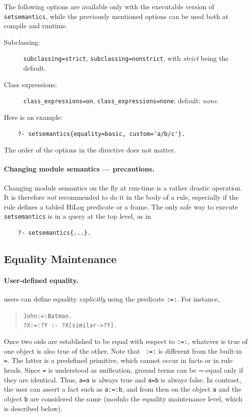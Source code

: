 \documentclass[11pt]{article}
\newcommand{\ERGO}{\mbox{\smaller{\ensuremath{\cal{E}}\smaller{{\sc{RGO}}}}}\xspace}
\newcommand{\FLSYSTEM}{\ERGO}
\begin{document}
The following options are available only with the executable version of
\texttt{setsemantics}, while the previously mentioned options can be used both
at compile and runtime.
  \begin{description}
  \item[Subclassing:] \texttt{subclassing=strict},
    \texttt{subclassing=nonstrict}, with \emph{strict} being the default.    
  \item[Class expressions:] \texttt{class\_expressions=on},
    \texttt{class\_expressions=none}; default: \emph{none}.
  \end{description}
Here is an example:
\begin{verbatim}
    ?- setsemantics{equality=basic, custom='a/b/c'}.  
\end{verbatim}
The order of the options in the directive does not matter.

\paragraph{Changing module semantics --- precautions.}
Changing module semantics on the fly at run-time is a rather drastic operation.
It is therefore \emph{not} recommended to do it in the body of a rule,
especially if the rule defines a tabled HiLog predicate or a frame.
The only safe way to execute {\tt setsemantics} is in a query at the top
level, as in
  \begin{verbatim}
    ?- setsemantics{...}.
  \end{verbatim}


\subsection{Equality Maintenance}\label{sec-eqmaintain}


\paragraph{User-defined equality.}
\FLSYSTEM users can define equality \emph{explicitly}
using the predicate {\tt :=:}. For instance,
\begin{quote}
{\tt John:=:Batman.} \\
{\tt ?X:=:?Y :- ?X[similar->?Y].} \\
\end{quote}
Once two oids are established to be equal with respect to {\tt :=:},
whatever is true of one object is also true of the other. Note that {\tt
  :=:} is different from the built-in {\tt =}. The latter is a predefined
primitive, which cannot occur in facts or in rule heads.  
Since {\tt =} is understood as unification, ground terms can be 
  =-equal only if they are identical. Thus, {\tt a=a} is always true and
{\tt a=b} is always false. In contrast, the user can assert a fact such as
{\tt a:=:b}, and from then on the object {\tt a} and the object {\tt b} are
considered the same (modulo the equality maintenance level, which is
described below).       
\end{document}
